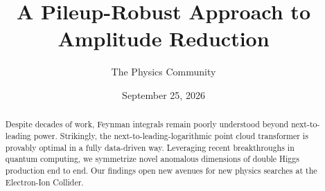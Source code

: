 \documentclass[11pt]{article}
\title{A Pileup-Robust Approach to Amplitude Reduction}
\author{The Physics Community}
\date{September 25, 2026}
\numberwithin{equation}{section}
\theoremstyle{definition}
\theoremstyle{remark}
\begin{document}
\maketitle
\begin{abstract}
Despite decades of work, Feynman integrals remain poorly understood
beyond next-to-leading power. Strikingly, the
next-to-leading-logarithmic point cloud transformer is provably optimal
in a fully data-driven way. Leveraging recent breakthroughs in quantum
computing, we symmetrize novel anomalous dimensions of double Higgs
production end to end. Our findings open new avenues for new physics
searches at the Electron-Ion Collider.
\end{abstract}
\tableofcontents





\nocite{*}


\end{document}
